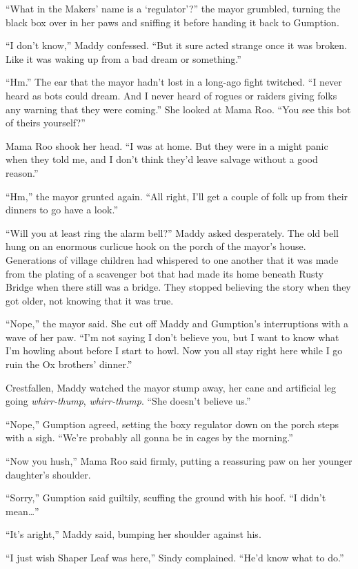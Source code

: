 \documentclass[10pt]{article}
\begin{document}
``What in the Makers' name is a `regulator'?'' the mayor grumbled,
turning the black box over in her paws and sniffing it before handing it
back to Gumption.

``I don't know,'' Maddy confessed. ``But it sure acted strange once it
was broken. Like it was waking up from a bad dream or something.''

``Hm.'' The ear that the mayor hadn't lost in a long-ago fight twitched.
``I never heard as bots could dream. And I never heard of rogues or
raiders giving folks any warning that they were coming.'' She looked at
Mama Roo. ``You see this bot of theirs yourself?''

Mama Roo shook her head. ``I was at home. But they were in a might panic
when they told me, and I don't think they'd leave salvage without a good
reason.''

``Hm,'' the mayor grunted again. ``All right, I'll get a couple of folk
up from their dinners to go have a look.''

``Will you at least ring the alarm bell?'' Maddy asked desperately. The
old bell hung on an enormous curlicue hook on the porch of the mayor's
house. Generations of village children had whispered to one another that
it was made from the plating of a scavenger bot that had made its home
beneath Rusty Bridge when there still was a bridge. They stopped
believing the story when they got older, not knowing that it was true.

``Nope,'' the mayor said. She cut off Maddy and Gumption's interruptions
with a wave of her paw. ``I'm not saying I don't believe you, but I want
to know what I'm howling about before I start to howl. Now you all stay
right here while I go ruin the Ox brothers' dinner.''

Crestfallen, Maddy watched the mayor stump away, her cane and artificial
leg going \emph{whirr-thump}, \emph{whirr-thump}. ``She doesn't believe
us.''

``Nope,'' Gumption agreed, setting the boxy regulator down on the porch
steps with a sigh. ``We're probably all gonna be in cages by the
morning.''

``Now you hush,'' Mama Roo said firmly, putting a reassuring paw on her
younger daughter's shoulder.

``Sorry,'' Gumption said guiltily, scuffing the ground with his hoof.
``I didn't mean\ldots{}''

``It's aright,'' Maddy said, bumping her shoulder against his.

``I just wish Shaper Leaf was here,'' Sindy complained. ``He'd know what
to do.''
\end{document}
